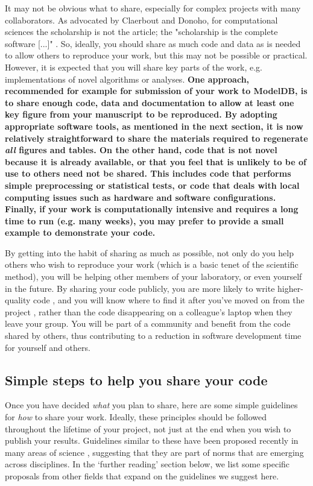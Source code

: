 \documentclass[11pt]{article}
\begin{document}
It may not be obvious what to share, especially for complex projects
with many collaborators.  As advocated by Claerbout and Donoho, for
computational sciences the scholarship is not the article; the
"scholarship is the complete software [...]"
\cite{claerbout_electronic_1992,donoho_invitation_2010}.  So, ideally,
you should share as much code and data as is needed to allow others to
reproduce your work, but this may not be possible or practical.
However, it is expected that you will share key parts of the work,
e.g. implementations of novel algorithms or analyses.  \textbf{One
  approach, recommended for example for submission of your work to
  ModelDB\cite{modeldb}, is to share enough code, data and
  documentation to allow at least one key figure from your manuscript
  to be reproduced.  By adopting appropriate software tools, as
  mentioned in the next section, it is now relatively straightforward
  to share the materials required to regenerate \textit{all} figures
  and tables.  On the other hand, code that is not novel because it is
  already available, or that you feel that is unlikely to be of use to
  others need not be shared.  This includes code that performs simple
  preprocessing or statistical tests, or code that deals with local
  computing issues such as hardware and software configurations.
  Finally, if your work is computationally intensive and requires a
  long time to run (e.g. many weeks), you may prefer to provide a
  small example to demonstrate your code.}

By getting into the habit of sharing as much as possible, not only do
you help others who wish to reproduce your work (which is a basic
tenet of the scientific method), you will be helping other members of
your laboratory, or even yourself in the future.  By sharing your code
publicly, you are more likely to write higher-quality code
\cite{Easterbrook2014}, and you will know where to find it after
you've moved on from the project \cite{Halchenko2015}, rather than the
code disappearing on a colleague's laptop when they leave your group.
You will be part of a community and benefit from the code shared by
others, thus contributing to a reduction in software development time
for yourself and others.


\subsection*{Simple steps to help you share your code}

Once you have decided \textit{what} you plan to share, here are some simple 
guidelines for \textit{how} to share your work.  Ideally, these
principles should be followed throughout the lifetime of your project,
not just at the end when you wish to publish your results. Guidelines similar to these have been proposed recently in many areas of science \cite{Nosek2015, miguel2014, stodden2012journals}, suggesting that they are part of norms that are emerging across disciplines. In the `further reading' section below, we list some specific proposals from other fields that expand on the guidelines we suggest here.  
\end{document}

